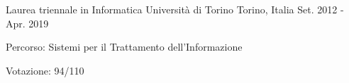 


\begin{cventries}


\cventry
{Laurea triennale in Informatica} %
{Università di Torino} %
{Torino, Italia} %
{Set. 2012 - Apr. 2019} %
{ %
	\begin{cvitems}
		\item {Percorso: Sistemi per il Trattamento dell'Informazione}
		\item {Votazione: 94/110}
	\end{cvitems}
}




\end{cventries}

\bigbreak

